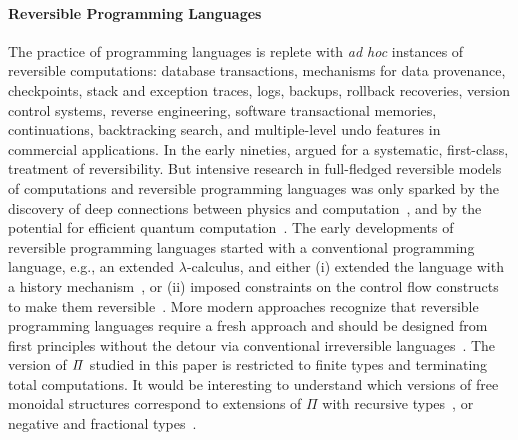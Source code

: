 \paragraph{Reversible Programming Languages} The practice of programming languages is replete with \emph{ad hoc}
instances of reversible computations: database transactions, mechanisms for data provenance, checkpoints, stack and
exception traces, logs, backups, rollback recoveries, version control systems, reverse engineering, software
transactional memories, continuations, backtracking search, and multiple-level undo features in commercial applications.
In the early nineties, \citet{bakerNREVERSALFortuneThermodynamics1992,bakerLivelyLinearLisp1992} argued for a
systematic, first-class, treatment of reversibility. But intensive research in full-fledged reversible models of
computations and reversible programming languages was only sparked by the discovery of deep connections between physics
and computation~\cite{landauerIrreversibilityHeatGeneration1961, peresReversibleLogicQuantum1985,
    toffoliReversibleComputing1980, bennettFundamentalPhysicalLimits1985, frankReversibilityEfficientComputing1999,
    heyFeynmanComputationExploring1999, fredkinConservativeLogic1982}, and by the potential for efficient quantum
computation~\cite{feynmanSimulatingPhysicsComputers1982}. The early developments of reversible programming languages
started with a conventional programming language, e.g., an extended $\lambda$-calculus, and either (i) extended the
language with a history mechanism~\cite{vantonderLambdaCalculusQuantum2004,klugeReversibleSECD2000,
    huelsbergenLogicallyReversibleEvaluator1996,danosReversibleCommunicatingSystems2004}, or (ii) imposed constraints on the
control flow constructs to make them reversible~\cite{yokoyamaReversibleProgrammingLanguage2007}. More modern approaches
recognize that reversible programming languages require a fresh approach and should be designed from first principles
without the detour via conventional irreversible languages~\cite{yokoyamaPrinciplesReversibleProgramming2008,
    muInjectiveLanguageReversible2004, abramskyStructuralApproachReversible2005, dipierroReversibleCombinatoryLogic2006}.
The version of $\mathit{\Pi}$ studied in this paper is restricted to finite types and terminating total computations. It
would be interesting to understand which versions of free monoidal structures correspond to extensions of $\Pi$ with
recursive types~\cite{jamesInformationEffects2012,bowmanDaggerTracedSymmetric2011}, or negative and fractional
types~\cite*{chenFractionalTypes2020,chenComputationalInterpretationCompact2021}.

